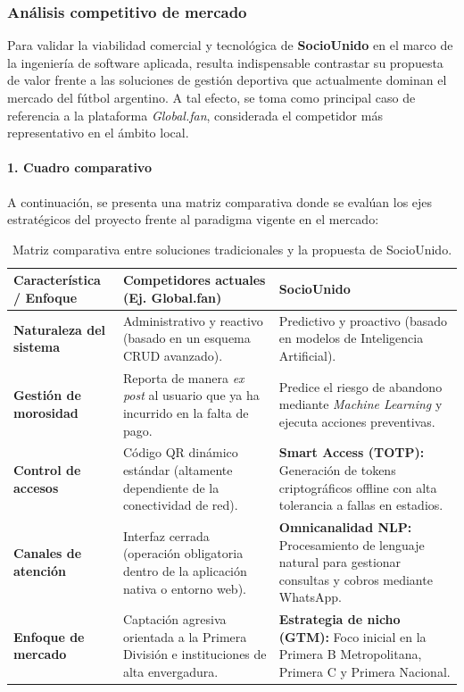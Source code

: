\newpage

\subsubsection{Análisis competitivo de mercado}

Para validar la viabilidad comercial y tecnológica de \textbf{SocioUnido} en el marco de la ingeniería de software aplicada, resulta indispensable contrastar su propuesta de valor frente a las soluciones de gestión deportiva que actualmente dominan el mercado del fútbol argentino. A tal efecto, se toma como principal caso de referencia a la plataforma \textit{Global.fan}, considerada el competidor más representativo en el ámbito local.

\paragraph{1. Cuadro comparativo}

A continuación, se presenta una matriz comparativa donde se evalúan los ejes estratégicos del proyecto frente al paradigma vigente en el mercado:

\begin{table}[h!]
\centering
\renewcommand{\arraystretch}{1.5}
\begin{tabularx}{\textwidth}{|l|X|X|}
\hline
\rowcolor{gray!20} \textbf{Característica / Enfoque} & \textbf{Competidores actuales (Ej. Global.fan)} & \textbf{SocioUnido} \\ \hline
\textbf{Naturaleza del sistema} & Administrativo y reactivo (basado en un esquema CRUD avanzado). & Predictivo y proactivo (basado en modelos de Inteligencia Artificial). \\ \hline
\textbf{Gestión de morosidad} & Reporta de manera \textit{ex post} al usuario que ya ha incurrido en la falta de pago. & Predice el riesgo de abandono mediante \textit{Machine Learning} y ejecuta acciones preventivas. \\ \hline
\textbf{Control de accesos} & Código QR dinámico estándar (altamente dependiente de la conectividad de red). & \textbf{Smart Access (TOTP):} Generación de tokens criptográficos offline con alta tolerancia a fallas en estadios. \\ \hline
\textbf{Canales de atención} & Interfaz cerrada (operación obligatoria dentro de la aplicación nativa o entorno web). & \textbf{Omnicanalidad NLP:} Procesamiento de lenguaje natural para gestionar consultas y cobros mediante WhatsApp. \\ \hline
\textbf{Enfoque de mercado} & Captación agresiva orientada a la Primera División e instituciones de alta envergadura. & \textbf{Estrategia de nicho (GTM):} Foco inicial en la Primera B Metropolitana, Primera C y Primera Nacional. \\ \hline
\end{tabularx}
\caption{Matriz comparativa entre soluciones tradicionales y la propuesta de SocioUnido.}
\label{tab:cuadro_comparativo}
\end{table}

